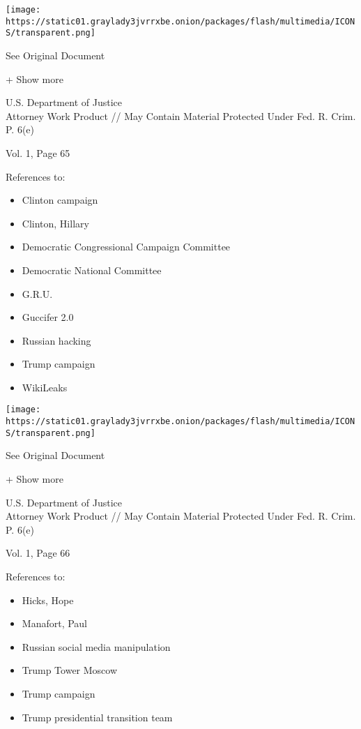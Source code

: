 \protect\hyperlink{}{}

\texttt{[image: https://static01.graylady3jvrrxbe.onion/packages/flash/multimedia/ICONS/transparent.png]}

See Original Document

+ Show more

U.S. Department of Justice\\
Attorney Work Product // May Contain Material Protected Under Fed. R.
Crim. P. 6(e)

Vol. 1, Page 65

References to:

\begin{itemize}
\tightlist
\item
  Clinton campaign
\item
  Clinton, Hillary
\item
  Democratic Congressional Campaign Committee
\item
  Democratic National Committee
\item
  G.R.U.
\item
  Guccifer 2.0
\item
  Russian hacking
\item
  Trump campaign
\item
  WikiLeaks
\end{itemize}

\protect\hyperlink{}{}

\texttt{[image: https://static01.graylady3jvrrxbe.onion/packages/flash/multimedia/ICONS/transparent.png]}

See Original Document

+ Show more

U.S. Department of Justice\\
Attorney Work Product // May Contain Material Protected Under Fed. R.
Crim. P. 6(e)

Vol. 1, Page 66

References to:

\begin{itemize}
\tightlist
\item
  Hicks, Hope
\item
  Manafort, Paul 
\item
  Russian social media manipulation
\item
  Trump Tower Moscow
\item
  Trump campaign
\item
  Trump presidential transition team
\end{itemize}

